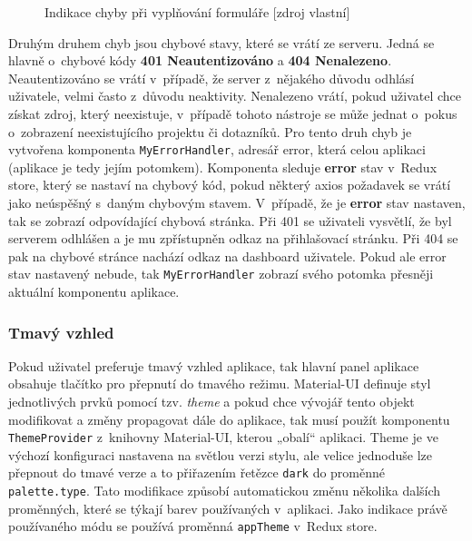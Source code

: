     \begin{figure}[!h]
    \begin{center}
    \caption{Indikace chyby při vyplňování formuláře [zdroj vlastní]}
    \label{fromikErr}
    \end{center}
    \end{figure}
    
Druhým druhem chyb jsou chybové stavy, které se vrátí ze serveru. Jedná se hlavně o~chybové kódy \textbf{401 Neautentizováno} a \textbf{404 Nenalezeno}. Neautentizováno se vrátí v~případě, že server z~nějakého důvodu odhlásí uživatele, velmi často z~důvodu neaktivity. Nenalezeno vrátí, pokud uživatel chce získat zdroj, který neexistuje, v~případě tohoto nástroje se může jednat o~pokus o~zobrazení neexistujícího projektu či dotazníků. Pro tento druh chyb je vytvořena komponenta \texttt{MyErrorHandler}, adresář error, která  celou aplikaci (aplikace je tedy jejím potomkem). Komponenta sleduje \textbf{error} stav v~Redux store, který se nastaví na chybový kód, pokud některý axios požadavek se vrátí jako neúspěšný s~daným chybovým stavem. V~případě, že je \textbf{error} stav nastaven, tak se zobrazí odpovídající chybová stránka. Při 401 se uživateli vysvětlí, že byl serverem odhlášen a je mu zpřístupněn odkaz na přihlašovací stránku. Při 404 se pak na chybové stránce nachází odkaz na dashboard uživatele. Pokud ale error stav nastavený nebude, tak \texttt{MyErrorHandler} zobrazí svého potomka přesněji aktuální komponentu aplikace.


\subsubsection *{Tmavý vzhled}

Pokud uživatel preferuje tmavý vzhled aplikace, tak hlavní panel aplikace obsahuje tlačítko pro přepnutí do tmavého režimu. Material-UI definuje styl jednotlivých prvků pomocí tzv. \textit{theme} a pokud chce vývojář tento objekt modifikovat a změny propagovat dále do aplikace, tak musí použít komponentu \texttt{ThemeProvider} z~knihovny Material-UI, kterou „obalí“ aplikaci. Theme je ve výchozí konfiguraci nastavena na světlou verzi stylu, ale velice jednoduše lze přepnout do tmavé verze a to přiřazením řetězce \texttt{dark} do proměnné \texttt{palette.type}. Tato modifikace způsobí automatickou změnu několika dalších proměnných, které se týkají barev používaných v~aplikaci. Jako indikace právě používaného módu se používá proměnná \texttt{appTheme} v~Redux store.

